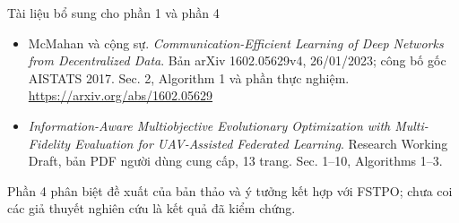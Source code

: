\documentclass[10pt,aspectratio=43]{beamer}
\begin{document}
\begin{frame}[t]{Tài liệu bổ sung cho phần 1 và phần 4}\relax
\small
\begin{itemize}
\item McMahan và cộng sự. \emph{Communication-Efficient Learning of Deep Networks from Decentralized Data}. Bản arXiv 1602.05629v4, 26/01/2023; công bố gốc AISTATS 2017. Sec. 2, Algorithm 1 và phần thực nghiệm.\\
\url{https://arxiv.org/abs/1602.05629}
\item \emph{Information-Aware Multiobjective Evolutionary Optimization with Multi-Fidelity Evaluation for UAV-Assisted Federated Learning}. Research Working Draft, bản PDF người dùng cung cấp, 13 trang. Sec. 1--10, Algorithms 1--3.
\end{itemize}
\par\medskip
Phần 4 phân biệt đề xuất của bản thảo và ý tưởng kết hợp với FSTPO; chưa coi các giả thuyết nghiên cứu là kết quả đã kiểm chứng.
\end{frame}
\end{document}
